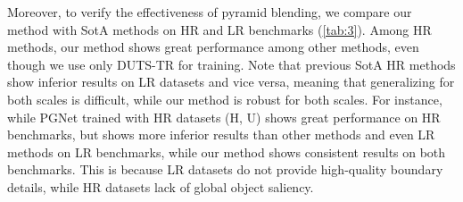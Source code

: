 \documentclass{llncs}
\begin{document}
    Moreover, to verify the effectiveness of pyramid blending, we compare our method with SotA methods on HR and LR benchmarks (\cref{tab:3}).
    Among HR methods, our method shows great performance among other methods, even though we use only DUTS-TR for training. 
    Note that previous SotA HR methods show inferior results on LR datasets and vice versa, meaning that generalizing for both scales is difficult, while our method is robust for both scales.
    For instance, while PGNet trained with HR datasets (H, U) shows great performance on HR benchmarks, 
    but shows more inferior results than other methods and even LR methods on LR benchmarks, while our method shows consistent results on both benchmarks.
    This is because LR datasets do not provide high-quality boundary details, while HR datasets lack of global object saliency.
    
\end{document}
